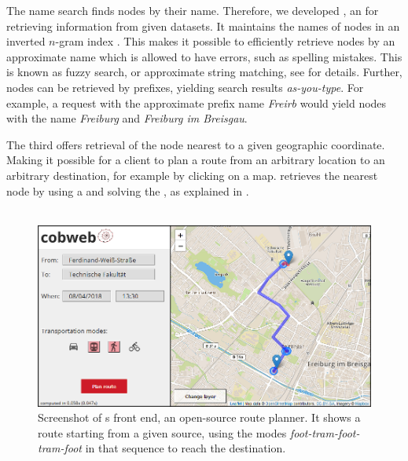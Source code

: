 	The name search \api finds \osm nodes by their name. Therefore, we developed \lexiSearch {}, an \api for retrieving
	information from given datasets.
	It maintains the names of \osm nodes in an inverted $n$-gram index . This makes it possible to efficiently
	retrieve nodes by an approximate name which is allowed to have errors, such as spelling mistakes. This is known as fuzzy search, or
	approximate string matching, see  for details. Further, nodes can be retrieved by prefixes, yielding search
	results \textit{as-you-type}. For example, a request with the approximate prefix name \textit{Freirb} would yield nodes with
	the name \textit{Freiburg} and \textit{Freiburg im Breisgau}.
	
	The third \api offers retrieval of the \osm node nearest to a given geographic coordinate. Making it possible for a client to plan a
	route from an arbitrary location to an arbitrary destination, for example by clicking on a map. \cobweb retrieves the nearest node by
	using a \coverTree and solving the \nearestNeighborProblem, as explained in .\\\\
	\begin{figure}[!ht]
		 \begin{center}
			\includegraphics[scale=0.5]{res/cobweb_frontend}
		\end{center}
		\caption{Screenshot of {\cobweb}s  front end, an open-source \multiModal route planner. It shows a \multiModal
		route starting from a given source, using the modes \textit{foot-tram-foot-tram-foot} in that sequence to reach the destination.}
		\label{cobweb_frontend}
	\end{figure}\quad\\
